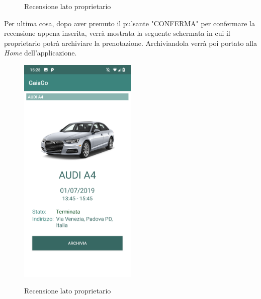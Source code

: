 \begin{itemize}
\begin{figure}[H]
		\caption{Recensione lato proprietario}
		\label{recensione2}
	\end{figure}
\pagebreak
	Per ultima cosa, dopo aver premuto il pulsante "CONFERMA" per confermare la recensione appena inserita, verrà mostrata la seguente schermata in cui il proprietario potrà archiviare la prenotazione. Archiviandola verrà poi portato alla \textit{Home} dell'applicazione.
	\begin{figure}[H] 
		\centering 
		\includegraphics[width=0.5\textwidth]{res/images/archivia_prenotazione.png}\\
		\caption{Recensione lato proprietario}
		\label{archivia}
	\end{figure}
\end{itemize}
\pagebreak

